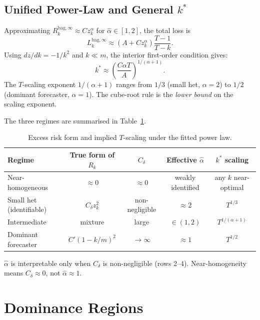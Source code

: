 \documentclass[12pt,a4paper]{article}
\theoremstyle{definition}
\begin{document}
\subsection{Unified Power-Law and General $k^*$}

Approximating $R_k^{\mathrm{bag},\infty}\approx Cz_k^\alpha$ for
$\hat\alpha\in[1,2]$, the total loss is
\begin{equation}
L_k^{\mathrm{bag},\infty}\approx(A+Cz_k^\alpha)\frac{T-1}{T-k}.
\end{equation}
Using $dz/dk=-1/k^2$ and $k\ll m$, the interior first-order condition gives:
\begin{equation}\label{eq:kstar_gen}
k^* \approx \left(\frac{C\alpha T}{A}\right)^{1/(\alpha+1)}.
\end{equation}
The $T$-scaling exponent $1/(\alpha+1)$ ranges from $1/3$ (small het,
$\alpha=2$) to $1/2$ (dominant forecaster, $\alpha=1$). The cube-root rule
is the \emph{lower bound} on the scaling exponent.

The three regimes are summarised in Table~\ref{tab:regimes}.

\begin{table}[ht]
\centering
\caption{Excess risk form and implied $T$-scaling under the fitted power law.}
\label{tab:regimes}
\begin{tabular}{lcccc}
\toprule
Regime & True form of $R_k$ & $C_\delta$ & Effective $\hat\alpha$ & $k^*$ scaling \\
\midrule
Near-homogeneous & $\approx 0$ & $\approx 0$ & weakly identified & any $k$ near-optimal \\
Small het (identifiable) & $C_\delta z_k^2$ & non-negligible & $\approx 2$ & $T^{1/3}$ \\
Intermediate & mixture & large & $\in(1,2)$ & $T^{1/(\alpha+1)}$ \\
Dominant forecaster & $C'(1-k/m)^2$ & $\to\infty$ & $\approx 1$ & $T^{1/2}$ \\
\bottomrule
\end{tabular}
\medskip
\footnotesize{$\hat\alpha$ is interpretable only when $C_\delta$ is non-negligible (rows 2--4).
Near-homogeneity means $C_\delta\approx0$, not $\hat\alpha\approx1$.}
\end{table}

\section{Dominance Regions}
\label{sec:dom}
\end{document}
